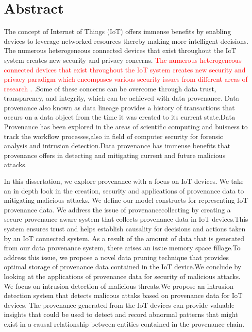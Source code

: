 

\chapter*{Abstract}
The concept of Internet of Things (IoT) offers immense benefits by
enabling devices to leverage networked resources thereby making more intelligent
decisions. The numerous heterogeneous connected devices that exist throughout
the IoT system creates new security and privacy concerns. \textcolor{red}{The numerous heterogeneous connected devices that exist throughout
the IoT system creates new security and privacy paradigm which encompases various security issues from different areas of research .} .Some of these concerns can
be overcome through data trust, transparency, and integrity, which can be
achieved with data provenance. Data provenance also known as data lineage provides a history of transactions that occurs on a data object from the time it was created to its current state.Data Provenance has been explored in the areas of scientific computing and buisness to track the workflow processes,also in field of computer security for forensic analysis and intrusion detection.Data provenance has immense benefits that provenance offers in detecting and mitigating current and future malicious attacks.  \par In this dissertation, we explore provenance with a focus on IoT devices. We take an in depth look  in the creation, security and applications of provenance data to mitigating malicious attacks. We define our model constructs for representing IoT provenance data. We address the issue of provenancecollecting by creating a secure provenance aware system that collects provenance data in IoT devices.This system ensures trust and helps establish causality for decisions and actions taken by an IoT connected system. As a result of the amount of data that is generated from our data provenance system, there arises an issue memory space fillage.To address this issue, we propose a novel data pruning technique that provides optimal storage of provenance data contained in the IoT device.We conclude by looking at the applications of provenance data for security of malicious attacks. We focus on intrusion detection of malicious threats.We propose an intrusion detection system that detects malicous attaks based on provenance data for IoT devices. The provenance generated from the IoT devices can provide valuable insights that could be used to detect and record abnormal patterns that might exist in a causal relationship between entities contained in the provenance chain.

